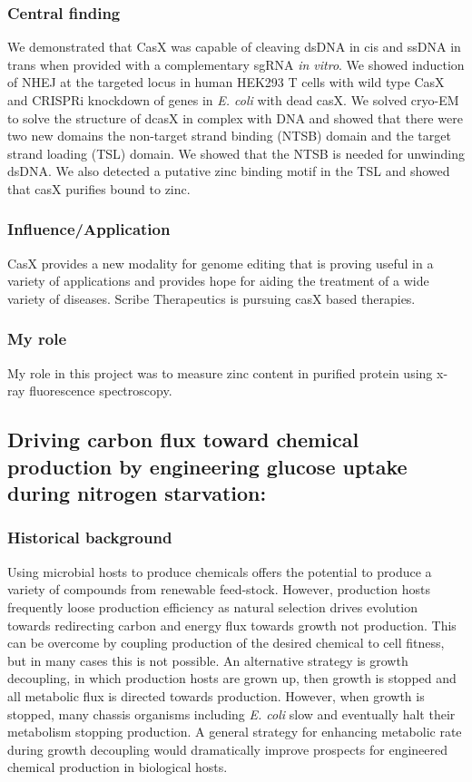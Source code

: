 \documentclass{article}
\begin{document}
\subsubsection{Central finding}
We demonstrated that CasX was capable of cleaving dsDNA in cis and ssDNA in trans when provided with a complementary sgRNA \textit{in vitro}.
We showed induction of NHEJ at the targeted locus in human HEK293 T cells with wild type CasX and CRISPRi knockdown of genes in \textit{E. coli} with dead casX.
We solved cryo-EM to solve the structure of dcasX in complex with DNA and showed that there were two new domains the non-target strand binding (NTSB) domain and the target strand loading (TSL) domain.
We showed that the NTSB is needed for unwinding dsDNA.
We also detected a putative zinc binding motif in the TSL and showed that casX purifies bound to zinc.
%
\subsubsection{Influence/Application}
CasX provides a new modality for genome editing that is proving useful in a variety of applications and provides hope for aiding the treatment of a wide variety of diseases.
Scribe Therapeutics is pursuing casX based therapies.
%
\subsubsection{My role}
My role in this project was to measure zinc content in purified protein using x-ray fluorescence spectroscopy.
%
\nocite{Liu2019-nk}
\printbibliography[heading=none]

\leavevmode\newline

\newrefsection
\subsection{Driving carbon flux toward chemical production by engineering glucose uptake during nitrogen starvation:}
\subsubsection{Historical background}
Using microbial hosts to produce chemicals offers the potential to produce a variety of compounds from renewable feed-stock.
However, production hosts frequently loose production efficiency as natural selection drives evolution towards redirecting carbon and energy flux towards growth not production.
This can be overcome by coupling production of the desired chemical to cell fitness, but in many cases this is not possible.
An alternative strategy is growth decoupling, in which production hosts are grown up, then growth is stopped and all metabolic flux is directed towards production.
However, when growth is stopped, many chassis organisms including \textit{E. coli} slow and eventually halt their metabolism stopping production.
A general strategy for enhancing metabolic rate during growth decoupling would dramatically improve prospects for engineered chemical production in biological hosts.
%
\end{document}
